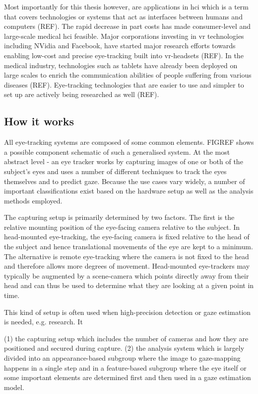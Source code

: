 Most importantly for this thesis however, are applications in \acrfull{hci} which is a term that covers technologies or systems that act as interfaces between humans and computers (REF). The rapid decrease in part costs has made consumer-level and large-scale medical \acrlong{hci} feasible. Major corporations investing in \acrfull{vr} technologies including NVidia and Facebook, have started major research efforts towards enabling low-cost and precise eye-tracking built into \acrshort{vr}-headsets (REF). In the medical industry, technologies such as tablets have already been deployed on large scales to enrich the communication abilities of people suffering from various diseases (REF). Eye-tracking technologies that are easier to use and simpler to set up are actively being researched as well (REF). 

\subsection{How it works}
All eye-tracking systems are composed of some common elements. FIGREF shows a possible component schematic of such a generalised system. At the most abstract level - an eye tracker works by capturing images of one or both of the subject's eyes and uses a number of different techniques to track the eyes themselves and to predict gaze. Because the use cases vary widely, a number of important classifications exist based on the hardware setup as well as the analysis methods employed.

The capturing setup is primarily determined by two factors. The first is the relative mounting position of the eye-facing camera relative to the subject. In \gls{head-mounted} \gls{eye-tracking},  the eye-facing camera is fixed relative to the head of the subject and hence translational movements of the eye are kept to a minimum. The alternative is remote \gls{eye-tracking} where the camera is not fixed to the head and therefore allows more degrees of movement. Head-mounted eye-trackers may typically be augmented by a \gls{scene-camera} which points directly away from their head and can thus be used to determine what they are looking at a given point in time.

This kind of setup is often used when high-precision detection or gaze estimation is needed, e.g. research. It 

 (1) the capturing setup which includes the number of cameras and how they are positioned and secured during capture. (2) the analysis system which is largely divided into an appearance-based subgroup where the image to gaze-mapping happens in a single step and in a feature-based subgroup where the eye itself or some important elements are determined first and then used in a gaze estimation model.

